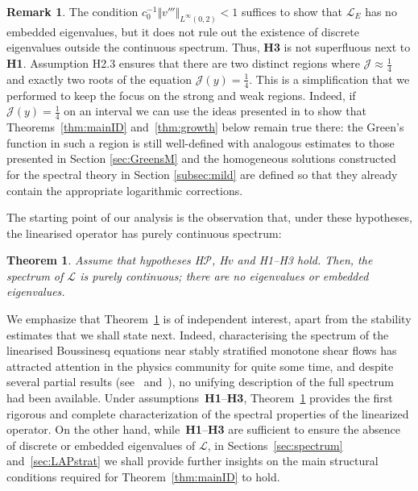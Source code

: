 \documentclass[11pt,reqno]{amsproc}
\newcounter{bigthm}
\newtheorem{bigtheorem}[bigthm]{Theorem}
\theoremstyle{definition}
\newtheorem{remark}[proposition]{Remark}
\numberwithin{equation}{section}
\renewcommand{\L}{{\mathcal{L}}}
\newcommand{\cJ}{{\mathcal{J}}}
\renewcommand{\P}{{\mathcal{P}}}
\begin{document}
\begin{remark}
{The condition $c_0^{-1}\Vert v''' \Vert_{L^\infty(0,2)}< 1$ suffices to show that $\L_E$ has no embedded eigenvalues, but it does not rule out the existence of discrete eigenvalues outside the continuous spectrum. Thus, \textbf{H3} is not superfluous next to \textbf{H1}}.
Assumption H2.3 ensures that there are two distinct regions where $\cJ\approx \frac14$ and exactly two roots of the equation $\cJ(y)=\frac14$. This is a simplification that we performed to keep the focus on the strong and weak regions. Indeed, if $\cJ(y) = \frac14$ on an interval we can use the ideas presented in \cite{CZN25chan} to show that Theorems~\ref{thm:mainID} and~\ref{thm:growth} below remain true there: the Green's function in such a region is still well-defined with analogous estimates to those presented in Section \ref{sec:GreensM} and the homogeneous solutions constructed for the spectral theory in Section \ref{subsec:mild} are defined so that they already contain the appropriate logarithmic corrections.
\end{remark}

The starting point of our analysis is the observation that, under these hypotheses, the linearised operator has purely continuous spectrum:

\begin{bigtheorem}\label{thm:spectrumL}
Assume that hypotheses H$\P$, H$v$ and H1--H3 hold. Then, the spectrum of $\L$ is  purely continuous; there are no eigenvalues or embedded eigenvalues. 
\end{bigtheorem}

   We emphasize that Theorem~\ref{thm:spectrumL} is of independent interest, apart from the stability estimates that we shall state next. Indeed, characterising the spectrum of the linearised Boussinesq equations near stably stratified monotone shear flows has attracted attention in the physics community for quite some time, and despite several partial results (see~\cites{Hirota,Miles,Howard} and~\cite[Section~3.2.2]{Yaglom}), no unifying description of the full spectrum had been available. Under assumptions~\textbf{H1}--\textbf{H3}, Theorem~\ref{thm:spectrumL} provides the first rigorous and complete characterization of the spectral properties of the linearized operator. On the other hand, while~\textbf{H1}--\textbf{H3} are sufficient to ensure the absence of discrete or embedded eigenvalues of \( \L \),  in Sections~\ref{sec:spectrum} and~\ref{sec:LAPstrat} we shall provide further insights on the main structural conditions required for Theorem~\ref{thm:mainID} to hold.
\end{document}
